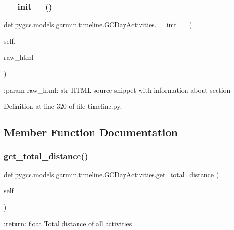 \subsubsection{\texorpdfstring{\+\_\+\+\_\+init\+\_\+\+\_\+()}{\_\_init\_\_()}}
{\footnotesize\ttfamily def pygce.\+models.\+garmin.\+timeline.\+G\+C\+Day\+Activities.\+\_\+\+\_\+init\+\_\+\+\_\+ (\begin{DoxyParamCaption}\item[{}]{self,  }\item[{}]{raw\+\_\+html }\end{DoxyParamCaption})}

\begin{DoxyVerb}:param raw_html: str
    HTML source snippet with information about section
\end{DoxyVerb}
 

Definition at line 320 of file timeline.\+py.



\subsection{Member Function Documentation}
\mbox{\label{classpygce_1_1models_1_1garmin_1_1timeline_1_1_g_c_day_activities_a2ad838af777ce178392b5f61ee6e6561}} 
\subsubsection{\texorpdfstring{get\+\_\+total\+\_\+distance()}{get\_total\_distance()}}
{\footnotesize\ttfamily def pygce.\+models.\+garmin.\+timeline.\+G\+C\+Day\+Activities.\+get\+\_\+total\+\_\+distance (\begin{DoxyParamCaption}\item[{}]{self }\end{DoxyParamCaption})}

\begin{DoxyVerb}:return: float
    Total distance of all activities
\end{DoxyVerb}
 

